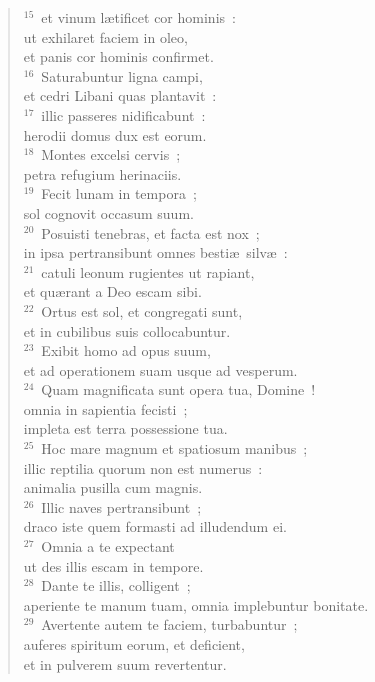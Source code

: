 \begin{flushleft}
\begin{verse}
${}^{15}$~et vinum l\ae tificet cor hominis~:\\ ut exhilaret faciem in oleo,\\ et panis cor hominis confirmet.\\
${}^{16}$~Saturabuntur ligna campi,\\ et cedri Libani quas plantavit~:\\
${}^{17}$~illic passeres nidificabunt~:\\ herodii domus dux est eorum.\\
${}^{18}$~Montes excelsi cervis~;\\ petra refugium herinaciis.\\
${}^{19}$~Fecit lunam in tempora~;\\ sol cognovit occasum suum.\\
${}^{20}$~Posuisti tenebras, et facta est nox~;\\ in ipsa pertransibunt omnes besti\ae\ silv\ae~:\\
${}^{21}$~catuli leonum rugientes ut rapiant,\\ et qu\ae rant a Deo escam sibi.\\
${}^{22}$~Ortus est sol, et congregati sunt,\\ et in cubilibus suis collocabuntur.\\
${}^{23}$~Exibit homo ad opus suum,\\ et ad operationem suam usque ad vesperum.\\
${}^{24}$~Quam magnificata sunt opera tua, Domine~!\\ omnia in sapientia fecisti~;\\ impleta est terra possessione tua.\\
${}^{25}$~Hoc mare magnum et spatiosum manibus~;\\ illic reptilia quorum non est numerus~:\\ animalia pusilla cum magnis.\\
${}^{26}$~Illic naves pertransibunt~;\\ draco iste quem formasti ad illudendum ei.\\
${}^{27}$~Omnia a te expectant\\ ut des illis escam in tempore.\\
${}^{28}$~Dante te illis, colligent~;\\ aperiente te manum tuam, omnia implebuntur bonitate.\\
${}^{29}$~Avertente autem te faciem, turbabuntur~;\\ auferes spiritum eorum, et deficient,\\ et in pulverem suum revertentur.\\

\end{verse}
\end{flushleft}
